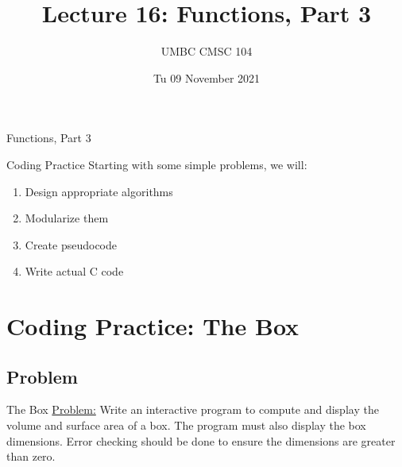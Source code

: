 \documentclass[graphics]{beamer}
\title{Lecture 16: Functions, Part 3}
\author{UMBC CMSC 104}
\date{Tu 09 November 2021}
\begin{document}
\begin{frame}{}
\centering
    Functions, Part 3
\end{frame}

\frame{\tableofcontents}

\begin{frame}{Coding Practice}
    Starting with some simple problems, we will:
    \begin{enumerate}
        \item Design appropriate algorithms
        \item Modularize them
        \item Create pseudocode
        \item Write actual C code
    \end{enumerate}
\end{frame}

\section{Coding Practice: The Box}
\subsection{Problem}
\begin{frame}{The Box}
    \underline{Problem:} Write an interactive program to compute and display the volume and surface area of a box. The program must also display the box dimensions. Error checking should be done to ensure the dimensions are greater than zero.
\end{frame}
\end{document}
